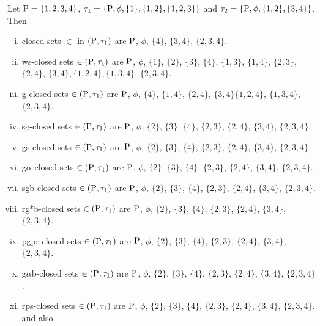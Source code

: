 \begin{exm}\label{exm2.2.19}
Let $\mathrm{P} = \{1, 2, 3, 4\}$, $\tau_{1} =\{\mathrm{P}, \phi, \{1\}, \{1, 2\},\{1, 2, 3\}\}$ and $\tau_{2} =\{\mathrm{P}, \phi, \{1, 2\},\{3, 4\}\}$. Then
\begin{enumerate}[(i)]
\item closed sets $\in$ in $(\mathrm{P}, \tau_{1})$ are $\mathrm{P}$, $\phi$, $\{4\}$, $\{3, 4\}$, $\{2, 3, 4\}$.
\item ws-closed sets $\in(\mathrm{P}, \tau_{1})$ are $\mathrm{P}$, $\phi$, $\{1\}$, $\{2\}$, $\{3\}$, $\{4\}$, $\{1, 3\}$, $\{1, 4\}$, $\{2, 3\}$, $\{2, 4\}$, $\{3, 4\}, \{1, 2, 4\}, \{1, 3, 4\}$, $\{2, 3, 4\}$.
\item g-closed sets $\in(\mathrm{P}, \tau_{1})$ are $\mathrm{P}$, $\phi$, $\{4\}$, $\{1, 4\}$, $\{2, 4\}$, $\{3, 4\}\{1, 2, 4\}$, $\{1, 3, 4\}$, $\{2, 3, 4\}$.
\item sg-closed sets $\in(\mathrm{P}, \tau_{1})$ are $\mathrm{P}$, $\phi$, $\{2\}$, $\{3\}$, $\{4\}$, $\{2, 3\}$, $\{2, 4\}$, $\{3, 4\}$, $\{2, 3, 4\}$.
\item gs-closed sets $\in(\mathrm{P}, \tau_{1})$ are $\mathrm{P}$, $\phi$, $\{2\}$, $\{3\}$, $\{4\}$, $\{2, 3\}$, $\{2, 4\}$, $\{3, 4\}$, $\{2, 3, 4\}$.
\item g$\alpha$-closed sets $\in(\mathrm{P}, \tau_{1})$ are $\mathrm{P}$, $\phi$, $\{2\}$, $\{3\}$, $\{4\}$, $\{2, 3\}$, $\{2, 4\}$, $\{3, 4\}$, $\{2, 3, 4\}$.
\item sgb-closed sets $\in(\mathrm{P}, \tau_{1})$ are $\mathrm{P}$, $\phi$, $\{2\}$, $\{3\}$, $\{4\}$, $\{2, 3\}$, $\{2, 4\}$, $\{3, 4\}$, $\{2, 3, 4\}$.
\item rg*b-closed sets $\in(\mathrm{P}, \tau_{1})$ are $\mathrm{P}$, $\phi$, $\{2\}$, $\{3\}$, $\{4\}$, $\{2, 3\}$, $\{2, 4\}$, $\{3, 4\}$, $\{2, 3, 4\}$.
\item pgpr-closed sets $\in(\mathrm{P}, \tau_{1})$ are $\mathrm{P}$, $\phi$, $\{2\}$, $\{3\}$, $\{4\}$, $\{2, 3\}$, $\{2, 4\}$, $\{3, 4\}$, $\{2, 3, 4\}$.
\item g$\alpha$b-closed sets $\in(\mathrm{P}, \tau_{1})$ are $\mathrm{P}$, $\phi$, $\{2\}$, $\{3\}$, $\{4\}$, $\{2, 3\}$, $\{2, 4\}$, $\{3, 4\}$, $\{2, 3, 4\}$.
\item rps-closed sets $\in(\mathrm{P}, \tau_{1})$ are $\mathrm{P}$, $\phi$, $\{2\}$, $\{3\}$, $\{4\}$, $\{2, 3\}$, $\{2, 4\}$, $\{3, 4\}$, $\{2, 3, 4\}$. and also
\end{enumerate}


\end{exm}
